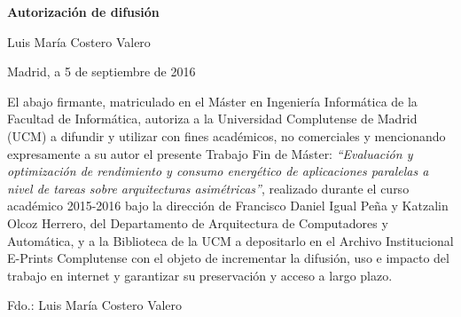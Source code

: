 % 

\cleardoublepage

\thispagestyle{empty}

\begin{center}

{\bf \Huge Autorización de difusión}

\vspace{1cm}

% 
   \large Luis María Costero Valero
      
   \vspace{0.5cm}

% 
   Madrid, a 5 de septiembre de 2016\\

   \vspace{0.5cm} \end{center}

 El abajo firmante, matriculado en el Máster en Ingeniería Informática de
 la Facultad de Informática, autoriza a la Universidad Complutense de
 Madrid (UCM) a difundir y utilizar con fines académicos, no comerciales y
 mencionando expresamente a su autor el presente Trabajo Fin de Máster:
 {\em ``Evaluación y optimización de rendimiento y consumo energético de
   aplicaciones paralelas a nivel de tareas sobre arquitecturas
   asimétricas''}, realizado durante el curso académico 2015-2016 bajo la
 dirección de Francisco Daniel Igual Peña y Katzalin Olcoz Herrero, del
 Departamento de Arquitectura de Computadores y Automática, y a la
 Biblioteca de la UCM a depositarlo en el Archivo Institucional E-Prints
 Complutense con el objeto de incrementar la difusión, uso e impacto del
 trabajo en internet y garantizar su preservación y acceso a largo plazo.


\vspace{3cm}
\begin{center}
  Fdo.: Luis María Costero Valero
\end{center}





